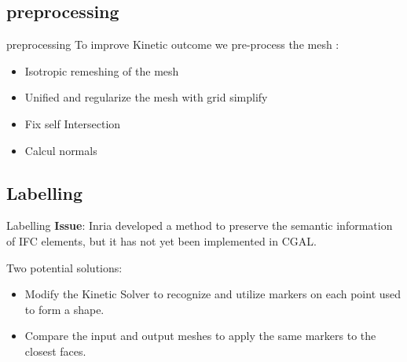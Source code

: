 \documentclass[10pt]{beamer}
\begin{document}
\subsection{preprocessing}
\begin{frame}{preprocessing}  
    To improve Kinetic outcome we pre-process the mesh :
    \begin{itemize}
        \item Isotropic remeshing of the mesh
        \item Unified and regularize the mesh with grid simplify
        \item Fix self Intersection 
        \item Calcul normals
    \end{itemize}
\end{frame}

\subsection{Labelling}
\begin{frame}{Labelling}
    \textbf{Issue}: Inria developed a method to preserve the semantic information of IFC elements, but it has not yet been implemented in CGAL.

     Two potential solutions:
    \begin{itemize}
        \item Modify the Kinetic Solver to recognize and utilize markers on each point used to form a shape.
        \item Compare the input and output meshes to apply the same markers to the closest faces.
    \end{itemize}
\end{frame}
\end{document}
